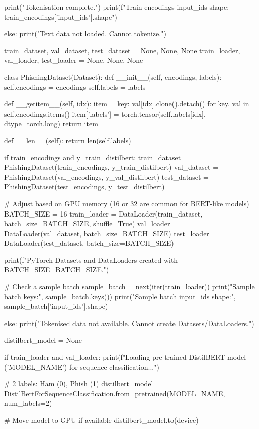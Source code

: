\begin{ffcode}
        print("Tokenisation complete.")
        print(f"Train encodings input_ids shape: {train_encodings['input_ids'].shape}")

else:
    print("Text data not loaded. Cannot tokenize.")

train_dataset, val_dataset, test_dataset = None, None, None
train_loader, val_loader, test_loader = None, None, None

class PhishingDataset(Dataset):
    def __init__(self, encodings, labels):
        self.encodings = encodings
        self.labels = labels

    def __getitem__(self, idx):
        item = {key: val[idx].clone().detach() for key, val in self.encodings.items()}
        item['labels'] = torch.tensor(self.labels[idx], dtype=torch.long)
        return item

    def __len__(self):
        return len(self.labels)

if train_encodings and y_train_distilbert:
    train_dataset = PhishingDataset(train_encodings, y_train_distilbert)
    val_dataset = PhishingDataset(val_encodings, y_val_distilbert)
    test_dataset = PhishingDataset(test_encodings, y_test_distilbert)

    # Adjust based on GPU memory (16 or 32 are common for BERT-like models)
    BATCH_SIZE = 16
    train_loader = DataLoader(train_dataset, batch_size=BATCH_SIZE, shuffle=True)
    val_loader = DataLoader(val_dataset, batch_size=BATCH_SIZE)
    test_loader = DataLoader(test_dataset, batch_size=BATCH_SIZE)

    print(f"PyTorch Datasets and DataLoaders created with BATCH_SIZE={BATCH_SIZE}.")

    # Check a sample batch
    sample_batch = next(iter(train_loader))
    print("Sample batch keys:", sample_batch.keys())
    print("Sample batch input_ids shape:", sample_batch['input_ids'].shape)

else:
    print("Tokenised data not available. Cannot create Datasets/DataLoaders.")

distilbert_model = None

if train_loader and val_loader:
    print(f"Loading pre-trained DistilBERT model ('{MODEL_NAME}') for sequence classification...")

    # 2 labels: Ham (0), Phish (1)
    distilbert_model = DistilBertForSequenceClassification.from_pretrained(MODEL_NAME, num_labels=2)

    # Move model to GPU if available
    distilbert_model.to(device)


\end{ffcode}
